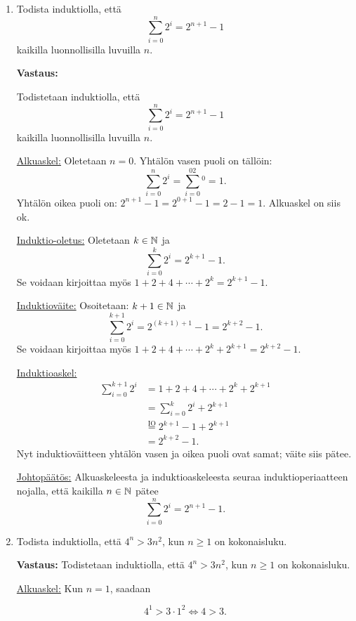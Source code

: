 \documentclass[a4paper,12pt]{article}
\begin{document}
\begin{enumerate}
\item Todista induktiolla, ett\"a 
$$\sum_{i=0}^n 2^i=2^{n+1}-1$$
kaikilla luonnollisilla luvuilla $n$.

\textbf{Vastaus:}

Todistetaan induktiolla, että $$\sum_{i=0}^n 2^i=2^{n+1}-1$$ kaikilla luonnollisilla luvuilla $n$.

\underline{Alkuaskel:} Oletetaan $n=0$. Yhtälön vasen puoli on tällöin:
\begin{equation*}
    \sum_{i=0}^n 2^i=\sum_{i=0}^02^0=1.
\end{equation*}
Yhtälön oikea puoli on: $2^{n+1}-1=2^{0+1}-1=2-1=1$. Alkuaskel on siis ok. 

\underline{Induktio-oletus:} Oletetaan $k\in \mathbb{N}$ ja
\begin{equation*}
    \sum_{i=0}^k2^i=2^{k+1}-1.
\end{equation*}
Se voidaan kirjoittaa myös $1+2+4+\cdots +2^k=2^{k+1}-1$.

\underline{Induktioväite:} Osoitetaan: $k+1\in \mathbb{N}$ ja
\begin{equation*}
    \sum_{i=0}^{k+1}2^i=2^{(k+1)+1}-1=2^{k+2}-1.
\end{equation*}
Se voidaan kirjoittaa myös $1+2+4+\cdots +2^k+2^{k+1}=2^{k+2}-1$.

\underline{Induktioaskel:} 
\begin{align*}
    \sum_{i=0}^{k+1}2^i&=1+2+4+\cdots +2^k+2^{k+1} \\
    &= \sum_{i=0}^k2^i+2^{k+1}\\
    &\stackrel{\text{IO}}{=}2^{k+1}-1+2^{k+1} \\
    &=2^{k+2}-1 .
\end{align*}
Nyt induktioväitteen yhtälön vasen ja oikea puoli ovat samat; väite siis pätee. 

\underline{Johtopäätös:} Alkuaskeleesta ja induktioaskeleesta seuraa induktioperiaatteen nojalla, että kaikilla $n\in \mathbb{N}$ pätee $$\sum_{i=0}^n 2^i=2^{n+1}-1.$$ \vspace{1em}
 
\item Todista induktiolla, ett\"a $4^n>3n^2$, kun $n\geq 1$ on kokonaisluku.

\textbf{Vastaus:} Todistetaan induktiolla, että $4^n>3n^2$, kun $n\geq 1$ on kokonaisluku.

\underline{Alkuaskel:} Kun $n=1$, saadaan

\begin{equation*}
    4^1>3\cdot 1^2 \iff 4>3.
\end{equation*}


\end{enumerate}
\end{document}
